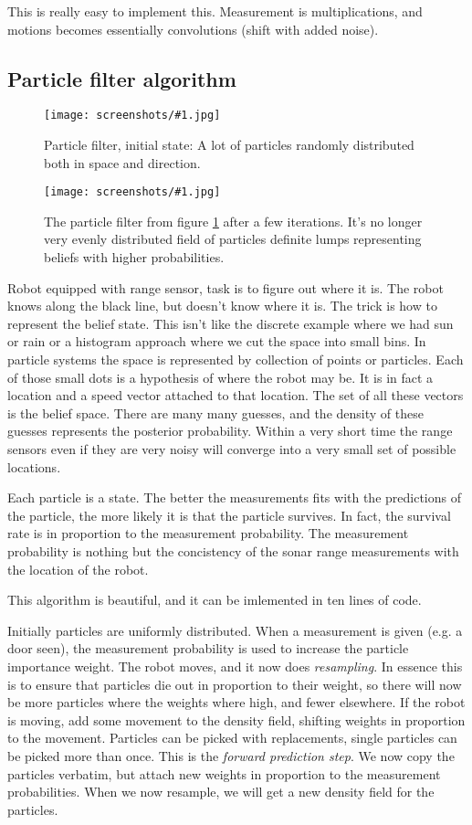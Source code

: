 \documentclass[a4, 12pt, english, USenglish]{scrreprt}
\newcommand{\screenshot}[2]{
\begin{figure}[htb]
\texttt{[image: screenshots/\#1.jpg]}
\label{#1}
\caption{#2}
\end{figure}}
\newcommand{\idx}[1]{{\em #1}\index{#1}}
\begin{document}
This is really easy to implement this.  Measurement is
multiplications, and motions becomes essentially convolutions (shift
with added noise).

\subsection{Particle filter algorithm}

\screenshot{particlefilter}{Particle filter, initial state: A lot of
  particles randomly distributed both in space and direction.}
\screenshot{particlefilter2}{The particle filter from figure
  \ref{particlefilter} after a few iterations. It's no longer very
  evenly distributed field of particles definite lumps representing
  beliefs with higher probabilities.}

Robot equipped with range sensor, task is to figure out where it is.
The robot knows along the black line, but doesn't know where it is.
The trick is how to represent the belief state.  This isn't like the
discrete example where we had sun or rain or a histogram approach
where we cut the space into small bins.   In particle systems the
space is represented by collection of points or particles.  Each of
those small dots is a hypothesis of where the robot may be.  It is in
fact a location and a speed vector attached to that location. The set
of all these vectors is the belief space.  There are many many
guesses, and the density of these guesses represents the posterior
probability.   Within a very short time the range sensors even if
they are very noisy will converge into a very small set of possible
locations.

Each particle is a state.   The better the measurements fits with the
predictions of the particle, the more likely it is that the particle
survives. In fact, the survival rate is in proportion to the
measurement probability.    The measurement probability is nothing but
the concistency of the sonar range measurements with the location of
the robot.

This algorithm is beautiful, and it can be imlemented in ten lines of
code.

Initially particles are uniformly distributed.    When a measurement
is given (e.g. a door seen), the measurement probability is used to
increase the particle importance weight.  The robot moves, and it now
does \idx{resampling}.  In essence this is to ensure that particles
die out in proportion to their weight, so there will now be more
particles where the weights where high, and fewer elsewhere.  If the
robot is moving, add some movement to the density field, shifting
weights in proportion to the movement.  Particles can be picked with
replacements, single particles can be picked more than once. This is
the \idx{forward prediction step}.  We now copy the particles
verbatim, but attach new weights in proportion to the measurement
probabilities.  When we now resample, we will get a new density field
for the particles.
\end{document}
